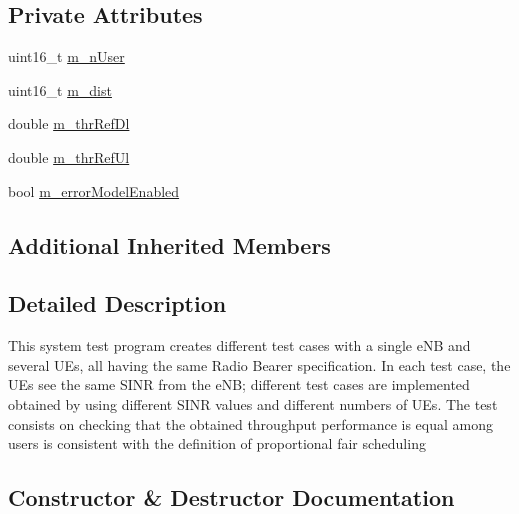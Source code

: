 \subsection*{Private Attributes}
\begin{DoxyCompactItemize}
\item 
uint16\+\_\+t \hyperlink{classLenaPfFfMacSchedulerTestCase1_a1d8b06961a8b7e440f643688069b9c7a}{m\+\_\+n\+User}
\item 
uint16\+\_\+t \hyperlink{classLenaPfFfMacSchedulerTestCase1_a40c463f5ae7fae52ca0f5ab1ed838a00}{m\+\_\+dist}
\item 
double \hyperlink{classLenaPfFfMacSchedulerTestCase1_a9d49e5ed252514020496bb42dfca0ca7}{m\+\_\+thr\+Ref\+Dl}
\item 
double \hyperlink{classLenaPfFfMacSchedulerTestCase1_a4a0d1aacb09837bc328ced85f024488b}{m\+\_\+thr\+Ref\+Ul}
\item 
bool \hyperlink{classLenaPfFfMacSchedulerTestCase1_a0bf76f059ed7435f6f1a281336b5c9fa}{m\+\_\+error\+Model\+Enabled}
\end{DoxyCompactItemize}
\subsection*{Additional Inherited Members}


\subsection{Detailed Description}
This system test program creates different test cases with a single e\+NB and several U\+Es, all having the same Radio Bearer specification. In each test case, the U\+Es see the same S\+I\+NR from the e\+NB; different test cases are implemented obtained by using different S\+I\+NR values and different numbers of U\+Es. The test consists on checking that the obtained throughput performance is equal among users is consistent with the definition of proportional fair scheduling 

\subsection{Constructor \& Destructor Documentation}
